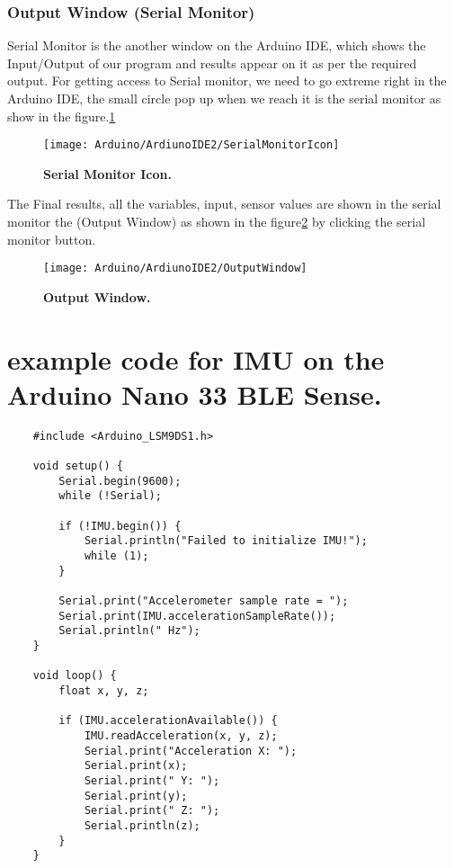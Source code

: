 \subsubsection{Output Window (Serial Monitor)}
Serial Monitor is the another window on the Arduino IDE, which shows the Input/Output of our program and results appear on it as per the required output. For getting
access to Serial monitor, we need to go extreme right in the Arduino IDE, the small
circle pop up when we reach it is the serial monitor as show in the figure.\ref{fig:Serial Monitor Icon}
\begin{figure}[H]\centering
    \texttt{[image: Arduino/ArdiunoIDE2/SerialMonitorIcon]}
    \caption{\textbf{Serial Monitor Icon.}}
    \label{fig:Serial Monitor Icon}		
\end{figure} 
The Final results, all the variables, input, sensor values are shown in the serial monitor
the (Output Window) as shown in the figure\ref{fig:Output Window} by clicking the serial monitor button.
\begin{figure}[H]\centering
    \texttt{[image: Arduino/ArdiunoIDE2/OutputWindow]}
    \caption{\textbf{Output Window.}}
    \label{fig:Output Window}		
\end{figure} 


\section{example code for IMU on the Arduino Nano 33 BLE Sense.}


\begin{verbatim}
    #include <Arduino_LSM9DS1.h>
    
    void setup() {
        Serial.begin(9600);
        while (!Serial);
        
        if (!IMU.begin()) {
            Serial.println("Failed to initialize IMU!");
            while (1);
        }
        
        Serial.print("Accelerometer sample rate = ");
        Serial.print(IMU.accelerationSampleRate());
        Serial.println(" Hz");
    }
    
    void loop() {
        float x, y, z;
        
        if (IMU.accelerationAvailable()) {
            IMU.readAcceleration(x, y, z);
            Serial.print("Acceleration X: ");
            Serial.print(x);
            Serial.print(" Y: ");
            Serial.print(y);
            Serial.print(" Z: ");
            Serial.println(z);
        }
    }
\end{verbatim}

